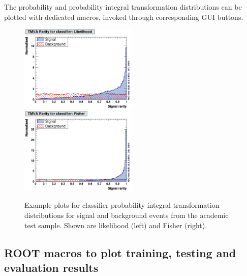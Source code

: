 The probability and probability integral transformation distributions can be plotted with dedicated macros, 
invoked through corresponding GUI buttons.
\begin{figure}[t]
\begin{center}
  \includegraphics[width=0.50\textwidth]{plots/Rarity-Likelihood}
  \hspace{-0.3cm}
  \includegraphics[width=0.50\textwidth]{plots/Rarity-Fisher}
\end{center}
\vspace{-0.5cm}
\caption[.]{Example plots for classifier probability integral transformation distributions for signal and 
            background events from the academic test sample. Shown are
            likelihood (left) and Fisher (right).}
\label{fig:usingtmva:rarity}
\end{figure}











\subsection{ROOT macros to plot training, testing and evaluation 
            results}
\label{sec:rootmacros}

